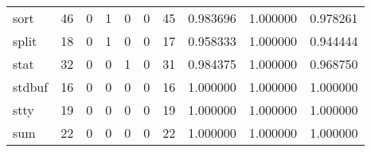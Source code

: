 \begin{tabular}{lrrrrrrrrr}
sort      &                                      46 &                                                  0 &                                                  1 &                                                  0 &                                                  0 &                                                 45 &                                           0.983696 &                               1.000000 &                             0.978261 \\
split     &                                      18 &                                                  0 &                                                  1 &                                                  0 &                                                  0 &                                                 17 &                                           0.958333 &                               1.000000 &                             0.944444 \\
stat      &                                      32 &                                                  0 &                                                  0 &                                                  1 &                                                  0 &                                                 31 &                                           0.984375 &                               1.000000 &                             0.968750 \\
stdbuf    &                                      16 &                                                  0 &                                                  0 &                                                  0 &                                                  0 &                                                 16 &                                           1.000000 &                               1.000000 &                             1.000000 \\
stty      &                                      19 &                                                  0 &                                                  0 &                                                  0 &                                                  0 &                                                 19 &                                           1.000000 &                               1.000000 &                             1.000000 \\
sum       &                                      22 &                                                  0 &                                                  0 &                                                  0 &                                                  0 &                                                 22 &                                           1.000000 &                               1.000000 &                             1.000000 \\

\end{tabular}
